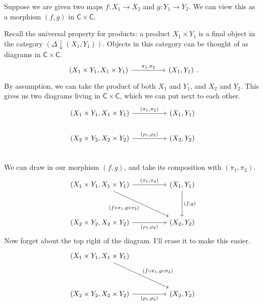 \documentclass[a4paper,10pt]{scrreprt}
\theoremstyle{definition}
\theoremstyle{plain}
\theoremstyle{remark}
\begin{document}
Suppose we are given two maps $f\colon X_{1} \to X_{2}$ and $g\colon Y_{1} \to Y_{2}$. We can view this as a morphism $(f,g)$ in $\mathsf{C} \times \mathsf{C}$.

Recall the universal property for products: a product $X_{1}\times Y_{1}$ is a final object in the category $(\Delta \downarrow (X_{1}, Y_{1}))$. Objects in this category can be thought of as diagrams in $\mathsf{C} \times \mathsf{C}$.
\begin{equation*}
  \begin{tikzcd}[column sep=huge]
    {(X_{1}\times Y_{1}, X_{1}\times Y_{1})} \arrow[r, "{\pi_{1}, \pi_{2}}"] & {(X_{1}, Y_{1})}
  \end{tikzcd}.
\end{equation*}
By assumption, we can take the product of both $X_{1}$ and $Y_{1}$, and $X_{2}$ and $Y_{2}$. This gives us two diagrams living in $\mathsf{C} \times \mathsf{C}$, which we can put next to each other. 
\begin{equation*}
  \begin{tikzcd}[column sep=huge]
    {(X_{1} \times Y_{1}, X_{1} \times Y_{1})} \arrow[r, "{(\pi_{1}, \pi_{2})}"] & (X_{1}, Y_{1}) \\
    {(X_{2} \times Y_{2}, X_{2} \times Y_{2})} \arrow[r, "{(\rho_{1}, \rho_{2})}"] & (X_{2}, Y_{2}) \\
  \end{tikzcd}
\end{equation*}
We can draw in our morphism $(f,g)$, and take its composition with $(\pi_{1}, \pi_{2})$.
\begin{equation*}
  \begin{tikzcd}[row sep=huge, column sep=huge]
    {(X_{1} \times Y_{1}, X_{1} \times Y_{1})} \arrow[r, "{(\pi_{1}, \pi_{2})}"] \arrow[dr, swap, "{(f\circ \pi_{1}, g \circ \pi_{2})}"] & (X_{1}, Y_{1}) \arrow[d, "{(f,g)}"] \\
    {(X_{2} \times Y_{2}, X_{2} \times Y_{2})} \arrow[r, swap, "{(\rho_{1}, \rho_{2})}"] & (X_{2}, Y_{2}) 
  \end{tikzcd}
\end{equation*}
Now forget about the top right of the diagram. I'll erase it to make this easier.
\begin{equation*}
  \begin{tikzcd}[row sep=huge, column sep=huge]
    {(X_{1} \times Y_{1}, X_{1} \times Y_{1})}  \arrow[dr, "{(f\circ \pi_{1}, g \circ \pi_{2})}"] & \\
    {(X_{2} \times Y_{2}, X_{2} \times Y_{2})} \arrow[r, swap, "{(\rho_{1}, \rho_{2})}"] & (X_{2}, Y_{2})
  \end{tikzcd}
\end{equation*}
\end{document}
